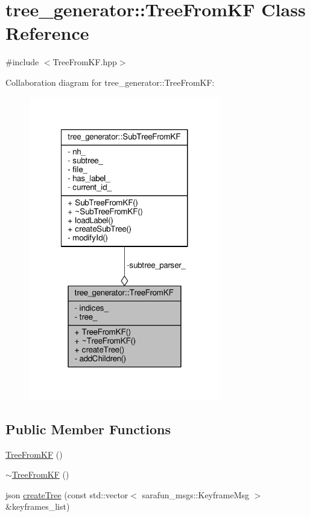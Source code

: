 \hypertarget{classtree__generator_1_1TreeFromKF}{\section{tree\-\_\-generator\-:\-:Tree\-From\-K\-F Class Reference}
\label{classtree__generator_1_1TreeFromKF}
}


{\ttfamily \#include $<$Tree\-From\-K\-F.\-hpp$>$}



Collaboration diagram for tree\-\_\-generator\-:\-:Tree\-From\-K\-F\-:\nopagebreak
\begin{figure}[H]
\begin{center}
\leavevmode
\includegraphics[width=236pt]{d1/dce/classtree__generator_1_1TreeFromKF__coll__graph}
\end{center}
\end{figure}
\subsection*{Public Member Functions}
\begin{DoxyCompactItemize}
\item 
\hyperlink{classtree__generator_1_1TreeFromKF_ae29828b16945e36e961283811c25e082_ae29828b16945e36e961283811c25e082}{Tree\-From\-K\-F} ()
\item 
\hyperlink{classtree__generator_1_1TreeFromKF_aaf65aa5f86c50c7496494e9338a10931_aaf65aa5f86c50c7496494e9338a10931}{$\sim$\-Tree\-From\-K\-F} ()
\item 
json \hyperlink{classtree__generator_1_1TreeFromKF_ac056f11be0625689ab20954944443755_ac056f11be0625689ab20954944443755}{create\-Tree} (const std\-::vector$<$ sarafun\-\_\-msgs\-::\-Keyframe\-Msg $>$ \&keyframes\-\_\-list)
\end{DoxyCompactItemize}

